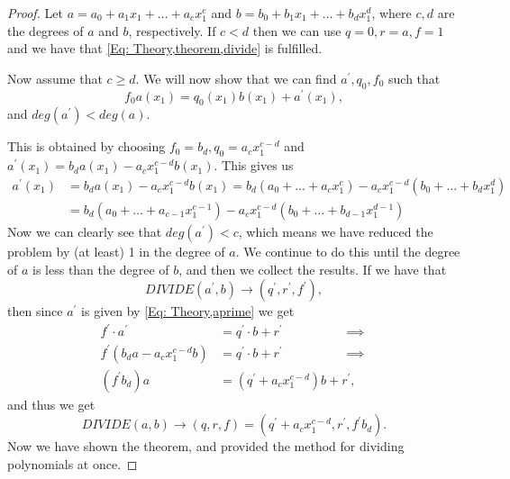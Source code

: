 \begin{proof}
  Let $a=a_0+a_1x_1+\ldots+a_cx_1^c$ and $b=b_0+b_1x_1+\ldots+b_dx_1^d$, where $c,d$ are the degrees of $a$ and $b$, respectively. If $c<d$ then we can use $q=0, r=a, f=1$ and we have that \eqref{Eq: Theory,theorem,divide} is fulfilled.

  Now assume that $c\geq d$. We will now show that we can find $a^\prime,q_0,f_0$ such that
  \begin{equation}
    f_0a(x_1) = q_0(x_1)b(x_1) + a^\prime(x_1),
  \end{equation}
  and $deg(a^\prime) < deg(a)$.

  This is obtained by choosing $f_0=b_d, q_0=a_cx_1^{c-d}$ and $a^\prime(x_1)=b_da(x_1)-a_cx_1^{c-d}b(x_1)$. This gives us
  \begin{equation}\label{Eq: Theory,aprime}
    \begin{split}
      a^\prime(x_1) & = b_da(x_1)-a_cx_1^{c-d}b(x_1) = b_d(a_0+\ldots+a_cx_1^c)-a_cx_1^{c-d}(b_0+\ldots+b_dx_1^d) \\
      & = b_d(a_0+\ldots+a_{c-1}x_1^{c-1})-a_cx_1^{c-d}(b_0+\ldots+b_{d-1}x_1^{d-1})
    \end{split}
  \end{equation}
  Now we can clearly see that $deg(a^\prime)<c$, which means we have reduced the problem by (at least) 1 in the degree of $a$. We continue to do this until the degree of $a$ is less than the degree of $b$, and then we collect the results. If we have that
  \begin{equation}
    DIVIDE(a^\prime,b) \rightarrow (q^\prime,r^\prime,f^\prime),
  \end{equation}
  then since $a^\prime$ is given by \eqref{Eq: Theory,aprime} we get
  \begin{equation}
    \begin{split}
      f^\prime\cdot a^\prime & =q^\prime\cdot b + r^\prime \hspace{2cm}\implies \\
      f^\prime (b_da-a_cx_1^{c-d}b) & =q^\prime\cdot b + r^\prime \hspace{2cm} \implies \\
      (f^\prime b_d)a & = (q^\prime + a_cx_1^{c-d})b + r^\prime,
    \end{split}
  \end{equation}
  and thus we get
  \begin{equation}
    DIVIDE(a,b) \rightarrow (q,r,f) = (q^\prime + a_cx_1^{c-d},r^\prime,f^\prime b_d).
  \end{equation}
  Now we have shown the theorem, and provided the method for dividing polynomials at once.
\end{proof}
